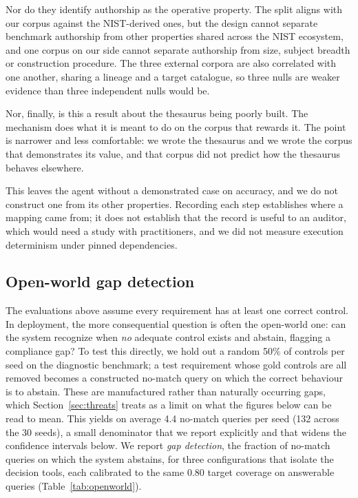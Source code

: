 \documentclass[smallextended,natbib]{svjour3}
\begin{document}
Nor do they identify authorship as the operative property. The split aligns with our corpus against the NIST-derived ones, but the design cannot separate benchmark authorship from other properties shared across the NIST ecosystem, and one corpus on our side cannot separate authorship from size, subject breadth or construction procedure. The three external corpora are also correlated with one another, sharing a lineage and a target catalogue, so three nulls are weaker evidence than three independent nulls would be.

Nor, finally, is this a result about the thesaurus being poorly built. The mechanism does what it is meant to do on the corpus that rewards it. The point is narrower and less comfortable: we wrote the thesaurus and we wrote the corpus that demonstrates its value, and that corpus did not predict how the thesaurus behaves elsewhere.

This leaves the agent without a demonstrated case on accuracy, and we do not construct one from its other properties. Recording each step establishes where a mapping came from; it does not establish that the record is useful to an auditor, which would need a study with practitioners, and we did not measure execution determinism under pinned dependencies.

\subsection{Open-world gap detection}
\label{sec:results-openworld}

The evaluations above assume every requirement has at least one correct control.
In deployment, the more consequential question is often the open-world one: can the system recognize when \emph{no} adequate control exists and abstain, flagging a compliance gap?
To test this directly, we hold out a random 50\% of controls per seed on the diagnostic benchmark; a test requirement whose gold controls are all removed becomes a constructed no-match query on which the correct behaviour is to abstain. These are manufactured rather than naturally occurring gaps, which Section~\ref{sec:threats} treats as a limit on what the figures below can be read to mean.
This yields on average 4.4 no-match queries per seed (132 across the 30 seeds), a small denominator that we report explicitly and that widens the confidence intervals below.
We report \emph{gap detection}, the fraction of no-match queries on which the system abstains, for three configurations that isolate the decision tools, each calibrated to the same 0.80 target coverage on answerable queries (Table~\ref{tab:openworld}).
\end{document}
